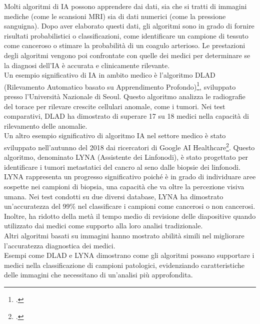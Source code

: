 Molti algoritmi di IA possono apprendere dai dati, sia che si tratti di immagini mediche (come le scansioni MRI) sia di dati numerici (come la pressione sanguigna). Dopo aver elaborato questi dati, gli algoritmi sono in grado di fornire risultati probabilistici o classificazioni, come identificare un campione di tessuto come canceroso o stimare la probabilità di un coagulo arterioso. Le prestazioni degli algoritmi vengono poi confrontate con quelle dei medici per determinare se la diagnosi dell'IA è accurata e clinicamente rilevante.\\

Un esempio significativo di IA in ambito medico è l'algoritmo DLAD (Rilevamento Automatico basato su Apprendimento Profondo)\footcite{site:intelligenza-artificiale-medicina}, sviluppato presso l'Università Nazionale di Seoul. Questo algoritmo analizza le radiografie del torace per rilevare crescite cellulari anomale, come i tumori. Nei test comparativi, DLAD ha dimostrato di superare 17 su 18 medici nella capacità di rilevamento delle anomalie.\\
Un altro esempio significativo di algoritmo IA nel settore medico è stato sviluppato nell'autunno del 2018 dai ricercatori di Google AI Healthcare\footcite{site:intelligenza-artificiale-medicina}. Questo algoritmo, denominato LYNA (Assistente dei Linfonodi), è stato progettato per identificare i tumori metastatici del cancro al seno dalle biopsie dei linfonodi. LYNA rappresenta un progresso significativo poiché è in grado di individuare aree sospette nei campioni di biopsia, una capacità che va oltre la percezione visiva umana. Nei test condotti su due diversi database, LYNA ha dimostrato un'accuratezza del 99\% nel classificare i campioni come cancerosi o non cancerosi. Inoltre, ha ridotto della metà il tempo medio di revisione delle diapositive quando utilizzato dai medici come supporto alla loro analisi tradizionale.\\
Altri algoritmi basati su immagini hanno mostrato abilità simili nel migliorare l'accuratezza diagnostica dei medici. \\
Esempi come DLAD e LYNA dimostrano come gli algoritmi possano supportare i medici nella classificazione di campioni patologici, evidenziando caratteristiche delle immagini che necessitano di un'analisi più approfondita.\\

